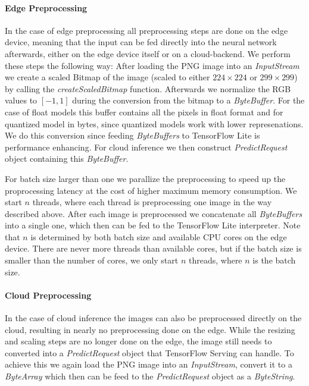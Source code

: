 \paragraph{Edge Preprocessing}
In the case of edge preprocessing all preprocessing steps are done on the edge device, meaning that the input can be fed directly into the neural network afterwards, either on the edge device itself or on a cloud-backend.
We perform these steps the following way: After loading the PNG image into an \emph{InputStream} we create a scaled Bitmap of the image (scaled to either $224\times224$ or $299\times299$) by calling the \emph{createScaledBitmap} function. 
Afterwards we normalize the RGB values to $[-1,1]$ during the conversion from the bitmap to a \emph{ByteBuffer}. 
For the case of float models this buffer contains all the pixels in float format and for quantized model in bytes, since quantized models work with lower represenations.
We do this conversion since feeding \emph{ByteBuffers} to TensorFlow Lite is performance enhancing. %
For cloud inference we then construct \emph{PredictRequest} object containing this \emph{ByteBuffer}.

For batch size larger than one we parallize the preprocessing to speed up the proprocessing latency at the cost of higher maximum memory consumption. We start $n$ threads, where each thread is preprocessing one image in the way described above. After each image is preprocessed we concatenate all \emph{ByteBuffers} into a single one, which then can be fed to the TensorFlow Lite interpreter. Note that $n$ is determined by both batch size and available CPU cores on the edge device. There are never more threads than available cores, but if the batch size is smaller than the number of cores, we only start $n$ threads, where $n$ is the batch size. 

\paragraph{Cloud Preprocessing}

In the case of cloud inference the images can also be preprocessed directly on the cloud, resulting in nearly no preprocessing done on the edge. While the resizing and scaling steps are no longer done on the edge, the image still needs to converted into a \emph{PredictRequest} object that TensorFlow Serving can handle.
To achieve this we again load the PNG image into an \emph{InputStream}, convert it to a \emph{ByteArray} which then can be feed to the \emph{PredictRequest} object as a \emph{ByteString}. 

